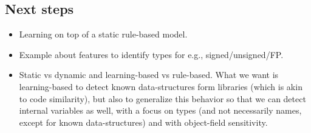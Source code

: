 \documentclass{article}
\begin{document}
\subsection{Next steps}

\begin{itemize}
	\item Learning on top of a static rule-based model.
	\item Example about features to identify types for e.g., signed/unsigned/FP.
	\item Static vs dynamic and learning-based vs rule-based. What we want is learning-based to detect known data-structures form libraries (which is akin to code similarity), but also to generalize this behavior so that we can detect internal variables as well, with a focus on types (and not necessarily names, except for known data-structures) and with object-field sensitivity.
\end{itemize}



\end{document}
